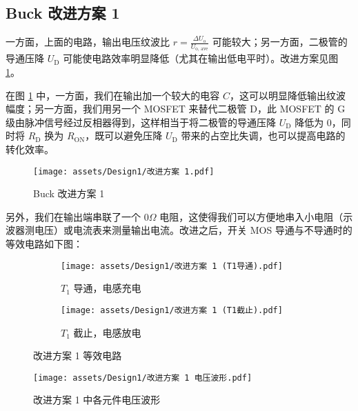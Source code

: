 \documentclass[UTF8]{article}
\theoremstyle{MyLineTheoremStyle} %
\theoremstyle{MyBlockTheoremStyle} %
\theoremstyle{MySubsubsectionStyle} %
\begin{document}
\subsection{Buck 改进方案 1}
一方面，上面的电路，输出电压纹波比 $r = \frac{\Delta U_{\text{o}}}{U_{\text{o, ave}}}$ 可能较大；另一方面，二极管的导通压降 $U_\text{D}$ 可能使电路效率明显降低（尤其在输出低电平时）。改进方案见图 \ref{Buck 改进方案 1}。

在图 \ref{Buck 改进方案 1} 中，一方面，我们在输出加一个较大的电容 $C$，这可以明显降低输出纹波幅度；另一方面，我们用另一个 MOSFET 来替代二极管 D，此 MOSFET 的 G 级由脉冲信号经过反相器得到，这样相当于将二极管的导通压降 $U_\text{D}$ 降低为 $0$，同时将 $R_{\text{D}}$ 换为 $R_{\text{ON}}$，既可以避免压降 $U_{\text{D}}$ 带来的占空比失调，也可以提高电路的转化效率。

\begin{figure}[H]\centering
    \texttt{[image: assets/Design1/改进方案 1.pdf]}
    \caption{Buck 改进方案 1}
    \label{Buck 改进方案 1}
\end{figure}

另外，我们在输出端串联了一个 $0 \Omega$ 电阻，这使得我们可以方便地串入小电阻（示波器测电压）或电流表来测量输出电流。改进之后，开关 MOS 导通与不导通时的等效电路如下图：
\begin{figure}[H]\centering
\begin{subfigure}[b]{0.5\columnwidth}\centering
    \texttt{[image: assets/Design1/改进方案 1 (T1导通).pdf]}
    \caption{$T_1$ 导通，电感充电}
\end{subfigure}\hfill
\begin{subfigure}[b]{0.5\columnwidth}\centering
    \texttt{[image: assets/Design1/改进方案 1 (T1截止).pdf]}
    \caption{$T_1$ 截止，电感放电}
\end{subfigure}
\caption{改进方案 1 等效电路}
\label{改进方案 1 等效电路}
\end{figure}

\begin{figure}[H]\centering
    \texttt{[image: assets/Design1/改进方案 1 电压波形.pdf]}
    \caption{改进方案 1 中各元件电压波形}
    \label{改进方案 1 中各元件电压波形}
\end{figure}
\end{document}
